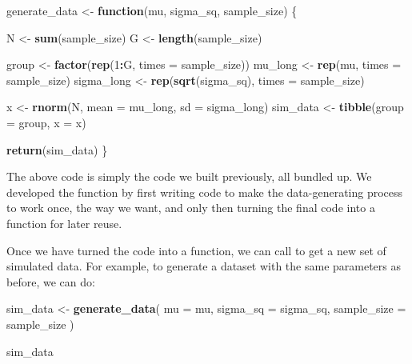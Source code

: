 \documentclass[
]{book}
\newenvironment{Shaded}{\begin{snugshade}}{\end{snugshade}}
\newcommand{\AttributeTok}[1]{\textcolor[rgb]{0.13,0.29,0.53}{#1}}
\newcommand{\ControlFlowTok}[1]{\textcolor[rgb]{0.13,0.29,0.53}{\textbf{#1}}}
\newcommand{\DecValTok}[1]{\textcolor[rgb]{0.00,0.00,0.81}{#1}}
\newcommand{\FunctionTok}[1]{\textcolor[rgb]{0.13,0.29,0.53}{\textbf{#1}}}
\newcommand{\NormalTok}[1]{#1}
\newcommand{\OtherTok}[1]{\textcolor[rgb]{0.56,0.35,0.01}{#1}}
\newcommand{\SpecialCharTok}[1]{\textcolor[rgb]{0.81,0.36,0.00}{\textbf{#1}}}
\begin{document}
\begin{Shaded}
\begin{Highlighting}[]
\NormalTok{generate\_data }\OtherTok{\textless{}{-}} \ControlFlowTok{function}\NormalTok{(mu, sigma\_sq, sample\_size) \{}

\NormalTok{  N }\OtherTok{\textless{}{-}} \FunctionTok{sum}\NormalTok{(sample\_size)}
\NormalTok{  G }\OtherTok{\textless{}{-}} \FunctionTok{length}\NormalTok{(sample\_size)}

\NormalTok{  group }\OtherTok{\textless{}{-}} \FunctionTok{factor}\NormalTok{(}\FunctionTok{rep}\NormalTok{(}\DecValTok{1}\SpecialCharTok{:}\NormalTok{G, }\AttributeTok{times =}\NormalTok{ sample\_size))}
\NormalTok{  mu\_long }\OtherTok{\textless{}{-}} \FunctionTok{rep}\NormalTok{(mu, }\AttributeTok{times =}\NormalTok{ sample\_size)}
\NormalTok{  sigma\_long }\OtherTok{\textless{}{-}} \FunctionTok{rep}\NormalTok{(}\FunctionTok{sqrt}\NormalTok{(sigma\_sq), }\AttributeTok{times =}\NormalTok{ sample\_size)}

\NormalTok{  x }\OtherTok{\textless{}{-}} \FunctionTok{rnorm}\NormalTok{(N, }\AttributeTok{mean =}\NormalTok{ mu\_long, }\AttributeTok{sd =}\NormalTok{ sigma\_long)}
\NormalTok{  sim\_data }\OtherTok{\textless{}{-}} \FunctionTok{tibble}\NormalTok{(}\AttributeTok{group =}\NormalTok{ group, }\AttributeTok{x =}\NormalTok{ x)}

  \FunctionTok{return}\NormalTok{(sim\_data)}
\NormalTok{\}}
\end{Highlighting}
\end{Shaded}

The above code is simply the code we built previously, all bundled up.
We developed the function by first writing code to make the data-generating process to work once, the way we want, and only then turning the final code into a function for later reuse.

Once we have turned the code into a function, we can call to get a new set of simulated data.
For example, to generate a dataset with the same parameters as before, we can do:

\begin{Shaded}
\begin{Highlighting}[]
\NormalTok{sim\_data }\OtherTok{\textless{}{-}} \FunctionTok{generate\_data}\NormalTok{(}
  \AttributeTok{mu =}\NormalTok{ mu, }
  \AttributeTok{sigma\_sq =}\NormalTok{ sigma\_sq,}
  \AttributeTok{sample\_size =}\NormalTok{ sample\_size}
\NormalTok{)}

\NormalTok{sim\_data}
\end{Highlighting}
\end{Shaded}
\end{document}
